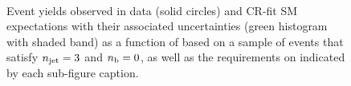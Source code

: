 \begin{figure}[h!]
\begin{center}
    \\
    \caption{Event yields observed in data (solid circles) and CR-fit SM expectations with their associated uncertainties (green histogram with shaded band) as a function of \HTmiss based on a sample of events that satisfy $n_{\text{jet}} = 3$ and $n_{\text{b}} = 0$, as well as the requirements on \scalht indicated by each sub-figure caption. }
    \label{fig:mhtdim_eq3j_eq0b}
  \end{center}
\end{figure}

